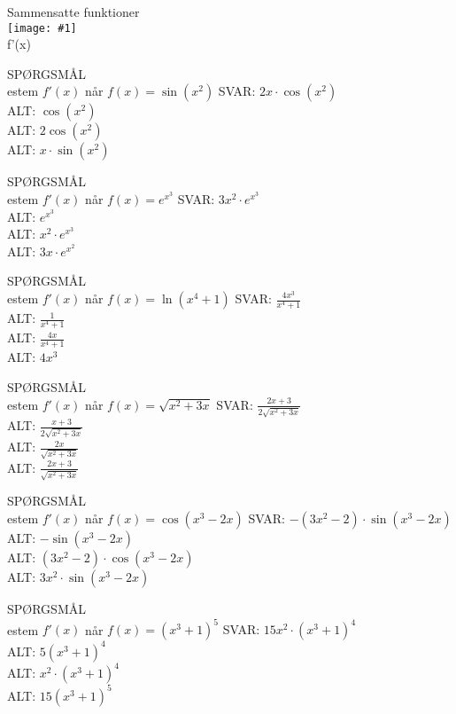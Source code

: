 \documentclass[]{article}
\newcounter{spgcounter}
\newenvironment{question}[2]{\addtocounter{spgcounter}{1} SPØRGSMÅL \thespgcounter\\}{\hspace{50px}}
\newcommand{\name}[1]{{\huge #1}\\}
\newcommand{\tag}[1]{#1}
\newcommand{\cover}[1]{\texttt{[image: \#1]}\\}
\newcommand{\answer}[1]{{\color{green} SVAR: #1}\\}
\newcommand{\alt}[1]{{\color{red} ALT: #1}\\}
\begin{document}
\name{Sammensatte funktioner}
\cover{kæderegelnonlinear.png}
\tag{f'(x)}

\begin{question}{multi}
    Bestem $f'(x)$ når $f(x)=\sin(x^2)$
    \answer{$2x \cdot \cos(x^2)$}
    \alt{$\cos(x^2)$}
    \alt{$2 \cos(x^2)$}
    \alt{$x \cdot \sin(x^2)$}
    \end{question}
    
    \begin{question}{multi}
    Bestem $f'(x)$ når $f(x)=e^{x^3}$
    \answer{$3x^2 \cdot e^{x^3}$}
    \alt{$e^{x^3}$}
    \alt{$x^2 \cdot e^{x^3}$}
    \alt{$3x \cdot e^{x^2}$}
    \end{question}
    
    \begin{question}{multi}
    Bestem $f'(x)$ når $f(x)=\ln(x^4 + 1)$
    \answer{$\frac{4x^3}{x^4 + 1}$}
    \alt{$\frac{1}{x^4 + 1}$}
    \alt{$\frac{4x}{x^4 + 1}$}
    \alt{$4x^3$}
    \end{question}
    
    \begin{question}{multi}
    Bestem $f'(x)$ når $f(x)=\sqrt{x^2 + 3x}$
    \answer{$\frac{2x + 3}{2\sqrt{x^2 + 3x}}$}
    \alt{$\frac{x + 3}{2\sqrt{x^2 + 3x}}$}
    \alt{$\frac{2x}{\sqrt{x^2 + 3x}}$}
    \alt{$\frac{2x + 3}{\sqrt{x^2 + 3x}}$}
    \end{question}
    
    \begin{question}{multi}
    Bestem $f'(x)$ når $f(x)=\cos(x^3 - 2x)$
    \answer{$-(3x^2 - 2) \cdot \sin(x^3 - 2x)$}
    \alt{$-\sin(x^3 - 2x)$}
    \alt{$(3x^2 - 2) \cdot \cos(x^3 - 2x)$}
    \alt{$3x^2 \cdot \sin(x^3 - 2x)$}
    \end{question}
        
    \begin{question}{multi}
    Bestem $f'(x)$ når $f(x)=(x^3 + 1)^5$
    \answer{$15x^2 \cdot (x^3 + 1)^4$}
    \alt{$5(x^3 + 1)^4$}
    \alt{$x^2 \cdot (x^3 + 1)^4$}
    \alt{$15(x^3 + 1)^5$}
    \end{question}
\end{document}
